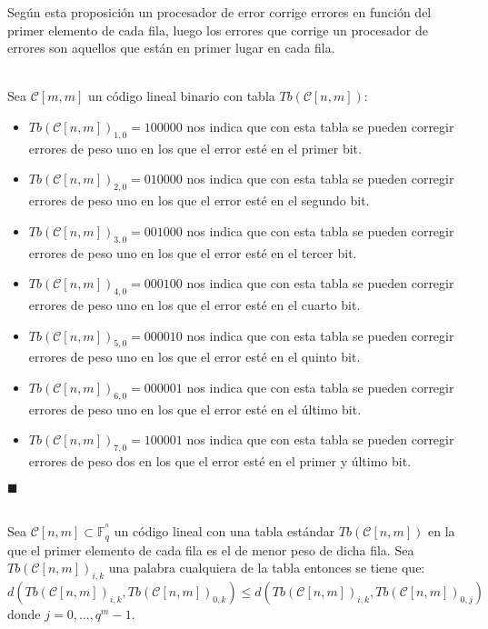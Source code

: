 Seg\'un esta proposici\'on un procesador de error corrige errores en funci\'on
del primer elemento de cada fila, luego los errores que corrige un procesador
de errores son aquellos que est\'an en primer lugar en cada fila.
%
\newpage
%
\begin{ejemplo}
\ \\
Sea $\mathcal{C}[m,m]$ un c\'odigo lineal binario con tabla
$Tb(\mathcal{C}[n,m])$:
\begin{itemize}
\item $Tb(\mathcal{C}[n,m])_{1,0}=100000$ nos indica que con esta tabla se
pueden corregir errores de peso uno en los que el error est\'e en el primer bit.
\item $Tb(\mathcal{C}[n,m])_{2,0}=010000$ nos indica que con esta tabla se
pueden corregir errores de peso uno en los que el error est\'e en el segundo
bit.
\item $Tb(\mathcal{C}[n,m])_{3,0}=001000$ nos indica que con esta tabla se
pueden corregir errores de peso uno en los que el error est\'e en el tercer bit.
\item $Tb(\mathcal{C}[n,m])_{4,0}=000100$ nos indica que con esta tabla se
pueden corregir errores de peso uno en los que el error est\'e en el cuarto bit.
\item $Tb(\mathcal{C}[n,m])_{5,0}=000010$ nos indica que con esta tabla se
pueden corregir errores de peso uno en los que el error est\'e en el quinto
bit.
\item $Tb(\mathcal{C}[n,m])_{6,0}=000001$ nos indica que con esta tabla se
pueden corregir errores de peso uno en los que el error est\'e en el \'ultimo
bit.
\item $Tb(\mathcal{C}[n,m])_{7,0}=100001$ nos indica que con esta tabla se
pueden corregir errores de peso dos en los que el error est\'e en el primer y
\'ultimo bit.
\end{itemize}
\begin{flushright}
$\blacksquare$
\end{flushright}
\end{ejemplo}
%
%
\begin{proposicion}\label{pro:Cercania}
\ \\
Sea $\mathcal{C}[n,m]\subset \mathbb{F}^{^n}_q$ un c\'odigo lineal
con una tabla est\'andar
$Tb(\mathcal{C}[n,m])$ en la que el primer elemento de cada fila es el de
menor peso de dicha fila. Sea $Tb(\mathcal{C}[n,m])_{i,k}$ una palabra
cualquiera de la tabla entonces se tiene que:
\begin{displaymath}
d(Tb(\mathcal{C}[n,m])_{i,k},Tb(\mathcal{C}[n,m])_{0,k})\leq
d(Tb(\mathcal{C}[n,m])_{i,k},Tb(\mathcal{C}[n,m])_{0,j}) 
\end{displaymath}
donde $j=0,\dots,q^{m}-1$.
\end{proposicion}
